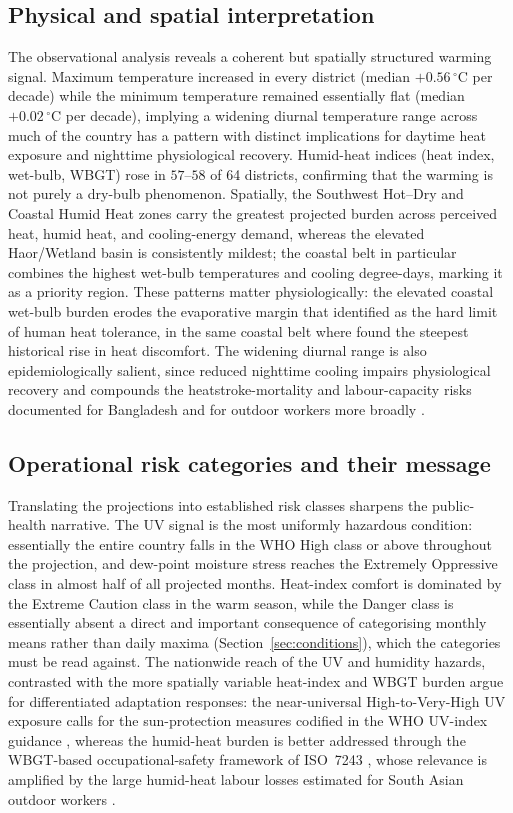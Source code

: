 \documentclass[pdflatex,sn-basic,lineno]{sn-jnl}
\newcommand{\degC}{\ensuremath{^{\circ}\mathrm{C}}}
\begin{document}
\subsection{Physical and spatial interpretation}
The observational analysis reveals a coherent but spatially structured warming
signal. Maximum temperature increased in every district (median $+0.56\,\degC$
per decade) while the minimum temperature remained essentially flat (median
$+0.02\,\degC$ per decade), implying a widening diurnal temperature range across
much of the country has a pattern with distinct implications for daytime heat
exposure and nighttime physiological recovery. Humid-heat indices (heat index,
wet-bulb, WBGT) rose in $57$--$58$ of 64 districts, confirming that the warming is
not purely a dry-bulb phenomenon. Spatially, the Southwest Hot--Dry and Coastal
Humid Heat zones carry the greatest projected burden across perceived heat,
humid heat, and cooling-energy demand, whereas the elevated Haor/Wetland basin is
consistently mildest; the coastal belt in particular combines the highest
wet-bulb temperatures and cooling degree-days, marking it as a priority region.
These patterns matter physiologically: the elevated coastal wet-bulb burden erodes
the evaporative margin that \citet{raymond2020} identified as the hard limit of
human heat tolerance, in the same coastal belt where \citet{tanim2024heat} found
the steepest historical rise in heat discomfort. The widening diurnal range is also
epidemiologically salient, since reduced nighttime cooling impairs physiological
recovery and compounds the heatstroke-mortality and labour-capacity risks
documented for Bangladesh and for outdoor workers more broadly
\citep{miah2026,flouris2022}.

\subsection{Operational risk categories and their message}
Translating the projections into established risk classes sharpens the
public-health narrative. The UV signal is the most uniformly hazardous condition:
essentially the entire country falls in the WHO High class or above throughout the
projection, and dew-point moisture stress reaches the Extremely Oppressive class
in almost half of all projected months. Heat-index comfort is dominated by the
Extreme Caution class in the warm season, while the Danger class is essentially
absent a direct and important consequence of categorising monthly means rather
than daily maxima (Section~\ref{sec:conditions}), which the categories must be
read against. The nationwide reach of the UV and humidity hazards, contrasted with
the more spatially variable heat-index and WBGT burden argue for differentiated
adaptation responses: the near-universal High-to-Very-High UV exposure calls for
the sun-protection measures codified in the WHO UV-index guidance \citep{who2002},
whereas the humid-heat burden is better addressed through the WBGT-based
occupational-safety framework of ISO~7243 \citep{iso7243_2017,parsons2006}, whose
relevance is amplified by the large humid-heat labour losses estimated for South
Asian outdoor workers \citep{parsons2021labor}.
\end{document}
